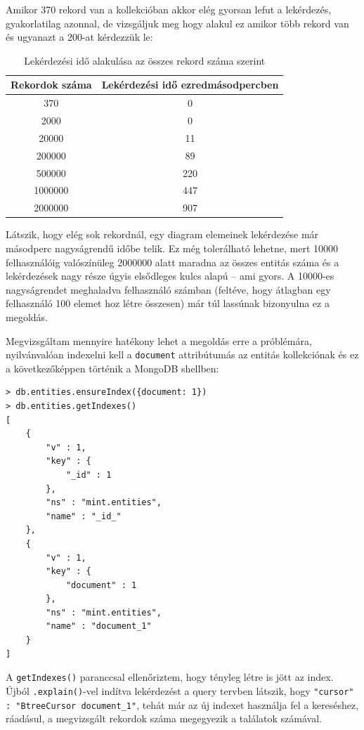 Amikor 370 rekord van a kollekcióban akkor elég gyorsan lefut a lekérdezés, gyakorlatilag azonnal, de vizsgáljuk meg hogy alakul ez amikor több rekord van és ugyanazt a 200-at kérdezzük le:


\begin{table}[H]
\centering
\begin{tabular}{|c|c|}

\hline
Rekordok száma & Lekérdezési idő ezredmásodpercben \\
\hline
370 & 0 \\
2000 & 0 \\
20000 & 11 \\
200000 & 89 \\
500000 & 220 \\
1000000 & 447 \\
2000000 & 907  \\
\hline
\end{tabular}
\caption{Lekérdezési idő alakulása az összes rekord száma szerint } 
\end{table}

Látszik, hogy elég sok rekordnál, egy diagram elemeinek lekérdezése már másodperc nagyságrendű időbe telik. Ez még tolerálható lehetne, mert 10000 felhasználóig valószínüleg 2000000 alatt maradna az összes entitás száma és a lekérdezések nagy része úgyis elsődleges kulcs alapú -- ami gyors. A 10000-es nagyságrendet meghaladva felhasználó számban (feltéve, hogy átlagban egy felhasználó 100 elemet hoz létre összesen) már túl lassúnak bizonyulna ez a megoldás.

Megvizsgáltam mennyire hatékony lehet a megoldás erre a próblémára, nyilvánvalóan indexelni kell a \lstinline{document} attribútumás az entitás kollekciónak és ez a következőképpen történik a MongoDB shellben:

\begin{lstlisting}[caption=Index létrehozása]
> db.entities.ensureIndex({document: 1})
> db.entities.getIndexes()
[
    {
        "v" : 1,
        "key" : {
            "_id" : 1
        },
        "ns" : "mint.entities",
        "name" : "_id_"
    },
    {
        "v" : 1,
        "key" : {
            "document" : 1
        },
        "ns" : "mint.entities",
        "name" : "document_1"
    }
]
\end{lstlisting}

A \lstinline{getIndexes()} paranccsal ellenőriztem, hogy tényleg létre is jött az index. Újból \lstinline{.explain()}-vel indítva lekérdezést a query tervben látszik, hogy \lstinline{"cursor" : "BtreeCursor document_1"}, tehát már az új indexet használja fel a kereséshez, ráadásul, a megvizsgált rekordok száma megegyezik a találatok számával. 

